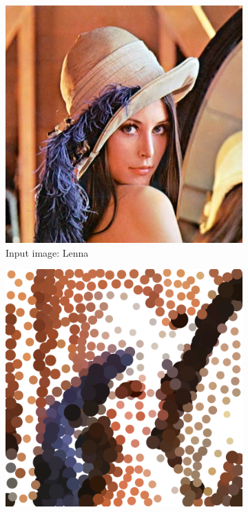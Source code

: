 \documentclass[11pt]{article}
\begin{document}
\begin{figure}[H]
    \centering
            \begin{subfigure}{0.4\textwidth}
        \centering
        \includegraphics[width=\textwidth]{../images/lenna.png}
 \caption{Input image: Lenna}
    \end{subfigure}
    \begin{subfigure}{0.4\textwidth}
        \centering
        \includegraphics[width=\textwidth]{../results/hedcuter/A-1.pdf}

\end{subfigure}
\end{figure}
\end{document}
